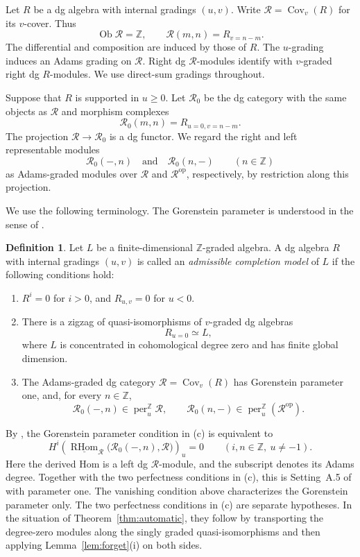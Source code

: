 \documentclass[12pt,a4paper,english,reqno]{amsart}
\theoremstyle{plain}
\theoremstyle{definition}
\newtheorem{dfn*}[thm]{Definition}
\numberwithin{equation}{section}
\def\perf{\operatorname{per}}
\def\Cov{\operatorname{Cov}}
\begin{document}
Let $R$ be a dg algebra with internal gradings $(u,v)$.
Write $\mathcal R=\Cov_v(R)$ for its $v$-cover.
Thus
\[
 \operatorname{Ob}\mathcal R=\mathbb Z,
 \qquad
 \mathcal R(m,n)=R_{v=n-m}.
\]
The differential and composition are induced by those of $R$.
The $u$-grading induces an Adams grading on $\mathcal R$.
Right dg $\mathcal R$-modules identify with $v$-graded
right dg $R$-modules. We use direct-sum gradings throughout.

Suppose that $R$ is supported in $u\geq0$.
Let $\mathcal R_0$ be the dg category with the same objects
as $\mathcal R$ and morphism complexes
\[
 \mathcal R_0(m,n)=R_{u=0,v=n-m}.
\]
The projection $\mathcal R\to\mathcal R_0$ is a dg functor.
We regard the right and left representable modules
\[
 \mathcal R_0(-,n)
 \quad\text{and}\quad
 \mathcal R_0(n,-)
 \qquad(n\in\mathbb Z)
\]
as Adams-graded modules over $\mathcal R$ and
$\mathcal R^{\mathrm{op}}$, respectively, by restriction
along this projection.

We use the following terminology.
The Gorenstein parameter is understood in the sense of
\cite[Definition A.1]{Han}.

\begin{dfn*}\label{def:admissible}
Let $L$ be a finite-dimensional $\mathbb Z$-graded algebra.
A dg algebra $R$ with internal gradings $(u,v)$ is called
an \emph{admissible completion model} of $L$ if the following
conditions hold:
\begin{enumerate}[label=(\alph*)]
\item
$R^i=0$ for $i>0$, and $R_{u,v}=0$ for $u<0$.

\item
There is a zigzag of quasi-isomorphisms of $v$-graded
dg algebras
\[
 R_{u=0}\simeq L,
\]
where $L$ is concentrated in cohomological degree zero
and has finite global dimension.

\item
The Adams-graded dg category $\mathcal R=\Cov_v(R)$
has Gorenstein parameter one, and, for every $n\in\mathbb Z$,
\[
 \mathcal R_0(-,n)\in\perf^{\mathbb Z}_u\mathcal R,
 \qquad
 \mathcal R_0(n,-)\in
 \perf^{\mathbb Z}_u(\mathcal R^{\mathrm{op}}).
\]
\end{enumerate}
\end{dfn*}

By \cite[Lemma A.4]{Han}, the Gorenstein parameter condition
in {\rm(c)} is equivalent to
\[
 H^i\!\left(
 \underline{\operatorname{RHom}}_{\mathcal R}
 \bigl(\mathcal R_0(-,n),\mathcal R\bigr)
 \right)_u=0
 \qquad
 (i,n\in\mathbb Z,\ u\ne-1).
\]
Here the derived Hom is a left dg $\mathcal R$-module,
and the subscript denotes its Adams degree.
Together with the two perfectness conditions in {\rm(c)},
this is Setting~A.5 of \cite{Han} with parameter one.
The vanishing condition above characterizes the Gorenstein
parameter only. The two perfectness conditions in {\rm(c)}
are separate hypotheses. In the situation of
Theorem~\ref{thm:automatic}, they follow by transporting
the degree-zero modules along the singly graded
quasi-isomorphisms and then applying
Lemma~\ref{lem:forget}(i) on both sides.
\end{document}
